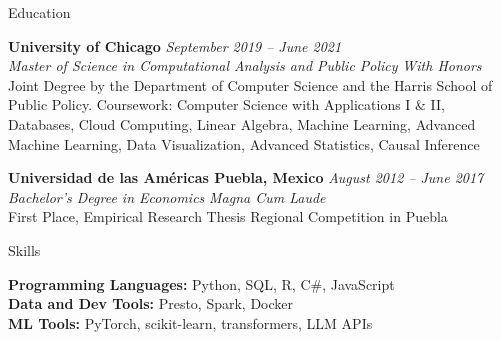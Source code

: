 \documentclass{resume} %
\begin{document}
\begin{rSection}{Education}

\textbf{University of Chicago}
\hfill
\textit{September 2019 -- June 2021}
\\
\textit{Master of Science in Computational Analysis and Public Policy}
\hfill
\textit{With Honors}
\\
{\small Joint Degree by the Department of Computer Science and the Harris
School of Public Policy. Coursework: Computer Science with Applications I \&
II, Databases, Cloud Computing, Linear Algebra, Machine Learning, Advanced
Machine Learning, Data Visualization, Advanced Statistics, Causal Inference}

\textbf{Universidad de las Américas Puebla, Mexico}
\hfill
\textit{August 2012 -- June 2017}
\\
\textit{Bachelor's Degree in Economics}
\hfill
\textit{Magna Cum Laude}
\\
{\small First Place, Empirical Research Thesis Regional Competition in Puebla}

\end{rSection}


\begin{rSection}{Skills}

{\small
\textbf{Programming Languages:} Python, SQL, R, C\#, JavaScript \\
\textbf{Data and Dev Tools:} Presto, Spark, Docker \\
\textbf{ML Tools:} PyTorch, scikit-learn, transformers, LLM APIs
}

\end{rSection}

\newpage

\end{document}
